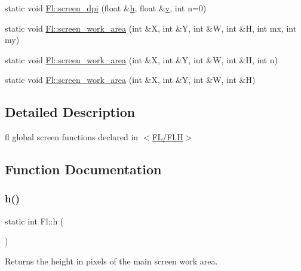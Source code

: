 \begin{DoxyCompactItemize}
\item 
static void \hyperlink{group__fl__screen_ga941ef73d565eb283803683b898531c75}{Fl\+::screen\+\_\+dpi} (float \&\hyperlink{group__fl__screen_ga0a9410a98136445bacce42b2e3ad4e84}{h}, float \&\hyperlink{forms_8_h_a3b90d5a73541ab9402511d87bed076ef}{v}, int n=0)
\item 
static void \hyperlink{group__fl__screen_ga9b70830f6c3b7829897841f4165afc5f}{Fl\+::screen\+\_\+work\+\_\+area} (int \&X, int \&Y, int \&W, int \&H, int mx, int my)
\item 
static void \hyperlink{group__fl__screen_ga31ff08a8203a1022b86868d5dc41ab9b}{Fl\+::screen\+\_\+work\+\_\+area} (int \&X, int \&Y, int \&W, int \&H, int n)
\item 
static void \hyperlink{group__fl__screen_gaf5d57c7b30d0b6e8adaa44027b89255e}{Fl\+::screen\+\_\+work\+\_\+area} (int \&X, int \&Y, int \&W, int \&H)
\end{DoxyCompactItemize}


\subsection{Detailed Description}
fl global screen functions declared in $<$\hyperlink{_fl_8_h}{F\+L/\+Fl.\+H}$>$ 

\subsection{Function Documentation}
\mbox{\label{group__fl__screen_ga0a9410a98136445bacce42b2e3ad4e84}} 
\subsubsection{\texorpdfstring{h()}{h()}}
{\footnotesize\ttfamily static int Fl\+::h (\begin{DoxyParamCaption}{ }\end{DoxyParamCaption})\hspace{0.3cm}{\ttfamily [static]}}

Returns the height in pixels of the main screen work area. \mbox{\label{group__fl__screen_ga8eff7d1c39455cd135ff4560250b3d05}} 
